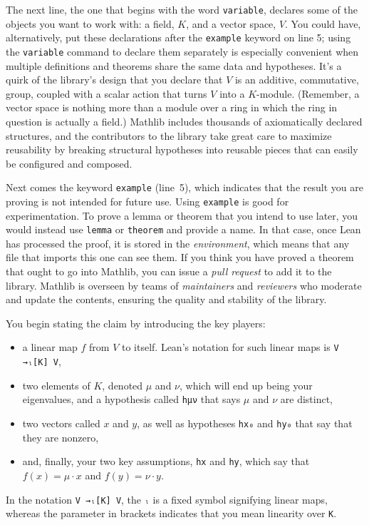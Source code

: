 \documentclass[11pt]{article}
\begin{document}
The next line, the one that begins with the word \lstinline{variable}, declares some of the objects you want to work with: a field, $K$, and a vector space, $V$.
You could have, alternatively, put these declarations after the \lstinline{example} keyword
on line 5; using the \lstinline{variable} command to declare them separately is especially
convenient when multiple definitions and theorems share the same data and hypotheses.
It's a quirk of the library's design that you declare that $V$ is an additive, commutative, group, coupled with a scalar action that turns $V$ into a $K$-module.
(Remember, a vector space is nothing more than a module over a ring in which the ring in question is actually a field.)
Mathlib includes thousands of axiomatically declared structures, and the contributors to the library take great care to maximize reusability by breaking structural hypotheses into reusable pieces that can easily be configured and composed.

Next comes the keyword \lstinline{example} (line~5), which indicates that the result you are proving is not intended for future use.
Using \lstinline{example} is good for experimentation.
To prove a lemma or theorem that you intend to use later, you would instead use \lstinline{lemma} or \lstinline{theorem} and provide a name.
In that case, once Lean has processed the proof, it is stored in the \emph{environment}, which means that any file that imports this one can see them.
If you think you have proved a theorem that ought to go into Mathlib, you can issue a \emph{pull request} to add it to the library.
Mathlib is overseen by teams of \emph{maintainers} and \emph{reviewers} who moderate and update the contents, ensuring the quality and stability of the library.

You begin stating the claim by introducing the key players:
\begin{itemize}
  \item a linear map $f$ from $V$ to itself. Lean's notation for such linear maps is \lstinline{V →ₗ[K] V},
  \item two elements of $K$, denoted $\mu$ and $\nu$, which will end up being your eigenvalues, and
    a hypothesis called \lstinline{hμν} that says $\mu$ and $\nu$ are distinct,
  \item two vectors called $x$ and $y$, as well as hypotheses \lstinline{hx₀} and \lstinline{hy₀} that say that they are nonzero,
  \item and, finally, your two key assumptions, \lstinline{hx} and \lstinline{hy}, which say that $f(x) = \mu \cdot x$ and $f(y) = \nu \cdot y$.
\end{itemize}
In the notation \lstinline{V →ₗ[K] V}, the \lstinline{ₗ} is a fixed symbol signifying linear maps,
whereas the parameter in brackets indicates that you mean linearity over \lstinline{K}.
\end{document}
